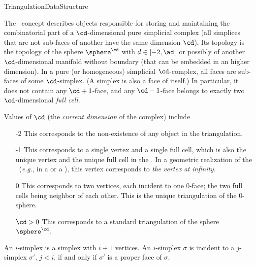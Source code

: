 \begin{ccRefConcept}{TriangulationDataStructure}

\ccDefinition

The \ccRefName\ concept describes objects responsible for storing and
maintaining the combinatorial part of a
$\cd$-dimensional pure simplicial complex (all simplices that are not
sub-faces of another have the same dimension $\cd$).
Its topology is the topology
of the sphere  $\sphere^\cd$ with $d\in[-2,\ad]$
or possibly of another $\cd$-dimensional manifold without boundary 
(that can be embedded in an higher dimension).
 In a  pure (or homogeneous) simplicial $\cd$-complex, all
 faces are sub-faces of some $\cd$-simplex. (A
simplex is also a face of itself.) In particular, it does not
contain any $\cd+1$-face, and any $\cd-1$-face belongs to exactly
two $\cd$-dimensional {\em full cell}. 

Values of $\cd$ (the \emph{current dimension} of the complex) include \begin{itemize}

\item[-2] This corresponds to the non-existence of any object in
the triangulation.

\item[-1] This corresponds to a single vertex and a single full cell,
  which is also the unique vertex and the unique full cell in the
  . 
 In a
geometric realization of the \ccRefName\ (\emph{e.g.}, in a
 or a
), this vertex
corresponds to \emph{the vertex at infinity}.

\item[0] This corresponds to two vertices, each incident to one $0$-face;
the two full cells being neighbor of each other. This is the unique
triangulation of the $0$-sphere.

\item[$\cd>0$] This corresponds to a standard triangulation of the sphere
$\sphere^\cd$.
\end{itemize}

An $i$-simplex is a simplex with $i+1$ vertices. An $i$-simplex $\sigma$ is
{incident} to a $j$-simplex $\sigma'$, $j<i$, if and only if $\sigma'$
is a proper face of $\sigma$. 

\ccHasModels



\end{ccRefConcept}
